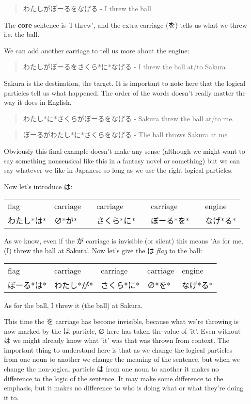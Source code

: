 \documentclass[11pt]{article}
\begin{document}
\begin{quote}
わたしがぼーるをなげる - I threw the ball
\end{quote}
The \textbf{core} sentence is 'I threw', and the extra carriage (を) tells us what we threw i.e. the ball.

We can add another carriage to tell us more about the engine:
\begin{quote}
わたしがぼーるをさくら*に*なげる - I threw the ball at/to Sakura
\end{quote}
Sakura is the destination, the target. It is important to note here that the logical particles tell us what happened. The order of the words doesn't really matter the way it does in English.
\begin{quote}
わたし*に*さくらがぼーるをなげる - Sakura threw the ball at/to me.
\end{quote}
\begin{quote}
ぼーるがわたし*に*さくらをなげる - The ball throws Sakura at me
\end{quote}
Obviously this final example doesn't make any sense (although we might want to say something nonsensical like this in a fantasy novel or something) but we can say whatever we like in Japanese so long as we use the right logical particles.

Now let's introduce は:
\begin{center}
\begin{tabular}{llllllll}
flag & carriage &  & carriage &  & carriage &  & engine\\
わたし*は* & ∅*が* &  & さくら*に* &  & ぼーる*を* &  & なげ*る*\\
\end{tabular}
\end{center}
As we know, even if the が carriage is invisible (or silent) this means 'As for me, (I) threw the ball at Sakura'. Now let's give the は \emph{flag} to the ball:
\begin{center}
\begin{tabular}{lllll}
flag & carriage & carriage & carriage & engine\\
ぼーる*は* & わたし*が* & さくら*に* & ∅*を* & なげ*る*\\
\end{tabular}
\end{center}
As for the ball, I threw it (the ball) at Sakura.

This time the を carriage has become invisible, because what we're throwing is now marked by the は particle, ∅ here has taken the value of 'it'. Even without は we might already know what 'it' was that was thrown from context. The important thing to understand here is that as we change the logical particles from one noun to another we change the meaning of the sentence, but when we change the non-logical particle は from one noun to another it makes no difference to the logic of the sentence. It may make some difference to the emphasis, but it makes no difference to who is doing what or what they're doing it to.
\end{document}
